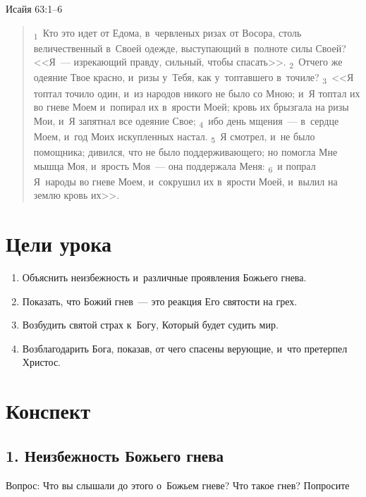 \documentclass[a4paper,12pt]{article}
\begin{document}
\noindent Исайя 63:1--6

\begin{quote}
\textsubscript{1}~Кто это идет от Едома, в~червленых ризах от Восора, столь величественный в~Своей одежде, выступающий в~полноте силы Своей? <<Я~--- изрекающий правду, сильный, чтобы спасать>>. 
\textsubscript{2}~Отчего же одеяние Твое красно, и~ризы у~Тебя, как у~топтавшего в~точиле? 
\textsubscript{3}~<<Я топтал точило один, и~из народов никого не было со Мною; и~Я топтал их во гневе Моем и~попирал их в~ярости Моей; кровь их брызгала на ризы Мои, и~Я запятнал все одеяние Свое; 
\textsubscript{4}~ибо день мщения~--- в~сердце Моем, и~год Моих искупленных настал. 
\textsubscript{5}~Я смотрел, и~не было помощника; дивился, что не было поддерживающего; но помогла Мне мышца Моя, и~ярость Моя~--- она поддержала Меня: 
\textsubscript{6}~и попрал Я~народы во гневе Моем, и~сокрушил их в~ярости Моей, и~вылил на землю кровь их>>. 
\end{quote}

\section*{Цели урока}
\begin{enumerate}
    \item Объяснить неизбежность и~различные проявления Божьего гнева.
    \item Показать, что Божий гнев~--- это реакция Его святости на грех.
    \item Возбудить святой страх к~Богу, Который будет судить мир.
    \item Возблагодарить Бога, показав, от чего спасены верующие, и~что претерпел Христос.
\end{enumerate}

\section*{Конспект}

\subsection{1. Неизбежность Божьего гнева}

Вопрос: Что вы слышали до этого о~Божьем гневе? Что такое гнев? Попросите студентов сформулировать своими словами.
\end{document}
